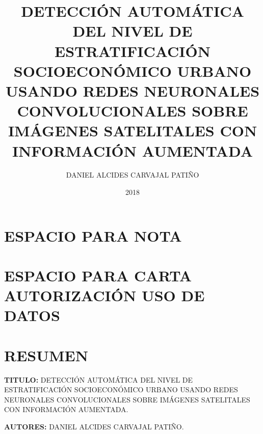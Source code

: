 


\usepackage{lipsum}
\usepackage{CJKutf8}



\title{DETECCIÓN AUTOMÁTICA DEL NIVEL DE ESTRATIFICACIÓN SOCIOECONÓMICO URBANO USANDO REDES NEURONALES CONVOLUCIONALES SOBRE IMÁGENES SATELITALES CON INFORMACIÓN AUMENTADA}
\author{DANIEL ALCIDES CARVAJAL PATIÑO}

\date{2018}






	\onehalfspace
	\maketitle
	\chapter*{ESPACIO PARA NOTA}
    \newpage
    \chapter*{ESPACIO PARA CARTA AUTORIZACIÓN USO DE DATOS}
    \newpage
	\tableofcontents
	\newpage \listoffigures
	\newpage \listoftables

	\setlength{\parskip}{\baselineskip} %
	\newpage\chapter*{RESUMEN}
    \textbf{TITULO:} DETECCIÓN AUTOMÁTICA DEL NIVEL DE ESTRATIFICACIÓN SOCIOECONÓMICO URBANO USANDO REDES NEURONALES CONVOLUCIONALES SOBRE IMÁGENES SATELITALES CON INFORMACIÓN AUMENTADA.
    
    \textbf{AUTORES:} DANIEL ALCIDES CARVAJAL PATIÑO.
    
